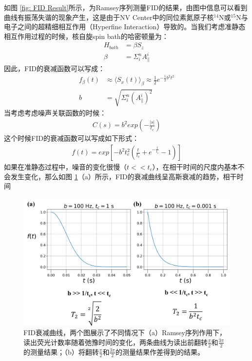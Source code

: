 \documentclass[type = bachelor]{whu-thesis}
\begin{document}
如图 \ref{fig: FID Result}所示，为Ramsey序列测量FID的结果，由图中信息可以看到曲线有振荡失谐的现象产生，这是由于NV Center中的同位素氮原子核$^{14}$N或$^{15}$N与电子之间的超精细相互作用（Hyperfine Interaction）导致的。当我们考虑准静态相互作用过程的时候，核自旋spin bath的哈密顿量为：
\begin{equation}
  \begin{aligned}
    H_{bath} &= \beta S_z \\
    \beta &= \Sigma^n_iA_{\parallel}^i
  \end{aligned}
\end{equation}
因此，FID的衰减函数可以写成：
\begin{equation}
  \begin{aligned}
    f_{\beta}(t) &\approx \langle S_x(t) \rangle_{\beta} \approx \frac{1}{2}e^{-\frac{1}{2}b^2t^2} \\
    b &= \sqrt{\Sigma_i^n(A_{\parallel}^i)^2}
  \end{aligned}
\end{equation}
当考虑考虑噪声关联函数的时候：
\begin{equation}
  \begin{aligned}
    C(s)=b^2exp(-\frac{|s|}{t_c})
  \end{aligned}
\end{equation}
这个时候FID的衰减函数可以写成如下形式：
\begin{equation}
  \begin{aligned}
    f(t)=exp[-b^2t_c^2(\frac{t}{t_c}+e^{-\frac{t}{t_c}}-1)]
  \end{aligned}
\end{equation}
如果在准静态过程中，噪音的变化很慢（$t<<t_c$），在相干时间的尺度内基本不会发生变化，那么如图 \ref{fig: FID Functions}（a）所示，FID的衰减曲线呈高斯衰减的趋势，相干时间

\begin{figure}
  \centering
  \includegraphics[width=1.0\textwidth]{figures/Chapter 1/FID Functions.png}
  \caption[FID衰减曲线]{FID衰减曲线，两个图展示了不同情况下（a）Ramsey序列作用下，读出荧光计数率随着弛豫时间的变化，两条曲线为读出前翻转$\frac{\pi}{2}$和$\frac{3\pi}{2}$的测量结果；（b）将翻转$\frac{\pi}{2}$和$\frac{3\pi}{2}$的测量结果作差得到的结果。}
  \label{fig: FID Functions}
\end{figure}
\end{document}
